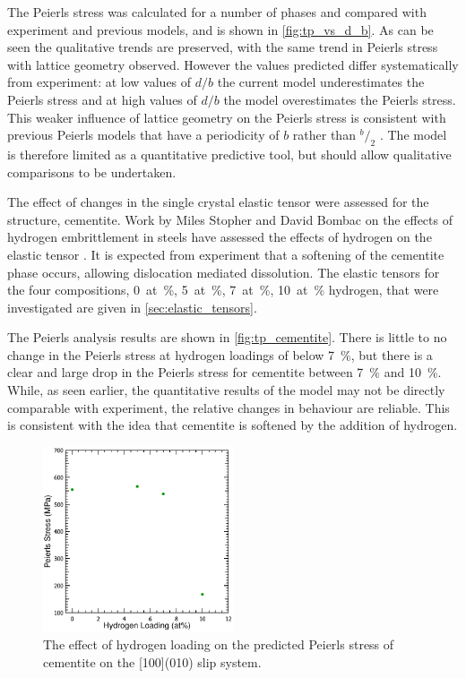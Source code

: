 The Peierls stress was calculated for a number of phases and compared with experiment and previous models, and is shown in \autoref{fig:tp_vs_d_b}. As can be seen the qualitative trends are preserved, with the same trend in Peierls stress with lattice geometry observed. However the values predicted  differ systematically from experiment: at low values of $d/b$ the current model underestimates the Peierls stress and at high values of $d/b$ the model overestimates the Peierls stress. This weaker influence of lattice geometry on the Peierls stress is consistent with previous Peierls models that have a periodicity of $b$ rather than $^b\!/_2$ \cite{Lu2000peierls}. The model is therefore limited as a quantitative predictive tool, but should allow qualitative comparisons to be undertaken.

The effect of changes in the single crystal elastic tensor were assessed for the  structure, cementite. Work by Miles Stopher and David Bombac on the effects of hydrogen embrittlement in steels have assessed the effects of hydrogen on the elastic tensor \cite{Stopher2017}. It is expected from experiment \cite{Stopher2017} that a softening of the cementite phase occurs, allowing dislocation mediated dissolution. The elastic tensors for the four compositions, \SI{0}{at\percent}, \SI{5}{at\percent}, \SI{7}{at\percent}, \SI{10}{at\percent} hydrogen, that were investigated are given in \autoref{sec:elastic_tensors}.



The Peierls analysis results are shown in \autoref{fig:tp_cementite}. There is little to no change in the Peierls stress at hydrogen loadings of below \SI{7}{\percent}, but there is a clear and large drop in the Peierls stress for cementite between \SI{7}{\percent} and \SI{10}{\percent}. While, as seen earlier, the quantitative results of the model may not be directly comparable with experiment, the relative changes in behaviour are reliable. This is consistent with the idea that cementite is softened by the addition of hydrogen.
\begin{figure}
\captionsetup{width=0.6\textwidth}
\centering
\includegraphics[width=0.5\textwidth]{Peierls_Stress_Cementite}
\caption[The effect of hydrogen on the Peierls stress of cementite]{The effect of hydrogen loading on the predicted Peierls stress of cementite on the [100](010) slip system.\label{fig:tp_cementite}}
\end{figure}


